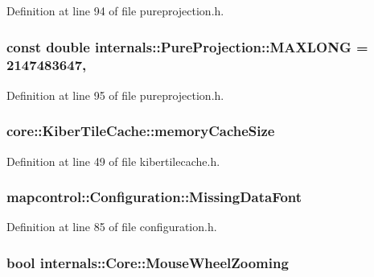 Definition at line 94 of file pureprojection.\-h.

\hypertarget{group___o_p_map_widget_gad58d07a94d560015458a3411190b5cc0}{
\subsubsection[{M\-A\-X\-L\-O\-N\-G}]{\setlength{\rightskip}{0pt plus 5cm}const {\bf double} internals\-::\-Pure\-Projection\-::\-M\-A\-X\-L\-O\-N\-G = 2147483647\hspace{0.3cm}{\ttfamily [static]}, {\ttfamily [protected]}}}\label{group___o_p_map_widget_gad58d07a94d560015458a3411190b5cc0}


Definition at line 95 of file pureprojection.\-h.

\hypertarget{group___o_p_map_widget_gae96e4700fe984a52afd8c8016dc1295b}{
\subsubsection[{memory\-Cache\-Size}]{ core\-::\-Kiber\-Tile\-Cache\-::memory\-Cache\-Size}}\label{group___o_p_map_widget_gae96e4700fe984a52afd8c8016dc1295b}


Definition at line 49 of file kibertilecache.\-h.

\hypertarget{group___o_p_map_widget_gacaef660cdedd3dc5c76abc6f6872b149}{
\subsubsection[{Missing\-Data\-Font}]{\setlength{\rightskip}{0pt plus 5cm}mapcontrol\-::\-Configuration\-::\-Missing\-Data\-Font}}\label{group___o_p_map_widget_gacaef660cdedd3dc5c76abc6f6872b149}


Definition at line 85 of file configuration.\-h.

\hypertarget{group___o_p_map_widget_ga051b1520271b875b55fa1023041a16e6}{
\subsubsection[{Mouse\-Wheel\-Zooming}]{\setlength{\rightskip}{0pt plus 5cm}bool internals\-::\-Core\-::\-Mouse\-Wheel\-Zooming}}\label{group___o_p_map_widget_ga051b1520271b875b55fa1023041a16e6}


